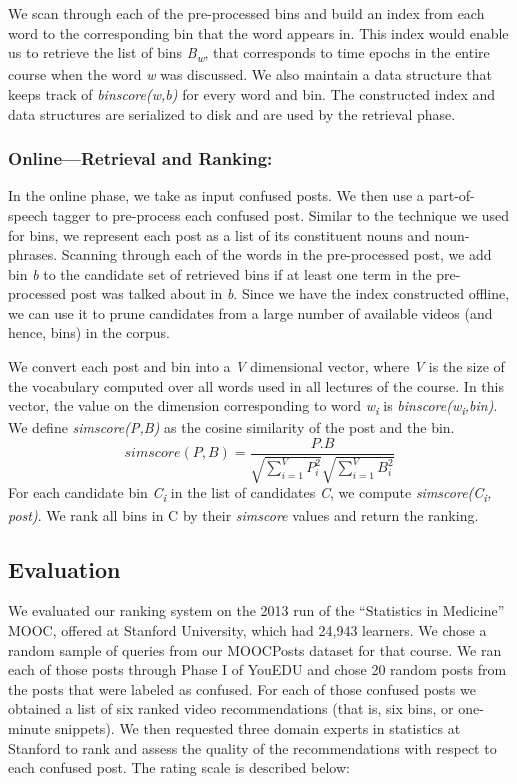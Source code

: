 \documentclass{edm_template}
\begin{document}
We scan through each of the pre-processed bins and build an index from each word to the corresponding bin that the word appears in. This index would enable us to retrieve the list of bins \textit{B\textsubscript{w}}, that corresponds to time epochs in the entire course when the word \textit{w} was discussed. We also maintain a data structure that keeps track of \textit{bin\textunderscore score(w,b)} for every word and bin. The constructed index and data structures are serialized to disk and are used by the retrieval phase.

\subsubsection{Online---Retrieval and Ranking:}
In the online phase, we take as input confused posts. We then use a part-of-speech tagger \cite{nltk} to pre-process each confused post. Similar to the technique we used for bins, we represent each post as a list of its constituent nouns and noun-phrases. Scanning through each of the words in the pre-processed post, we add bin \textit{b} to the candidate set of retrieved bins if at least one term in the pre-processed post was talked about in \textit{b}. Since we have the index constructed offline, we can use it to prune candidates from a large number of available videos (and hence, bins) in the corpus.

We convert each post and bin into a \textit{V} dimensional vector, where \textit{V} is the size of the vocabulary computed over all words used in all lectures of the course. In this vector, the value on the dimension corresponding to word  \textit{w\textsubscript i} is \textit{binscore(w\textsubscript i,bin)}. We define \textit{simscore(P,B)} as the cosine similarity of the post and the bin.
\begin{equation}
simscore(P,B) = \frac{P.B}{\sqrt{\sum\limits_{i=1}^V P_i ^2} \sqrt{\sum\limits_{i=1}^V B_i ^2}  }
\end{equation}
For each candidate bin \textit{C\textsubscript i} in the list of candidates \textit{C}, we compute \textit{simscore(C\textsubscript i, post)}. We rank all bins in C by their \textit{simscore} values and return the ranking.

\subsection{Evaluation}

We evaluated our ranking system on the 2013 run of the ``Statistics in Medicine'' MOOC, offered at Stanford University, which had 24,943 learners. We chose a random sample of queries from our MOOCPosts dataset for that course. We ran each of those posts through Phase I of YouEDU and chose 20 random posts from the posts that were labeled as confused. For each of those confused posts we obtained a list of six ranked video recommendations (that is, six bins, or one-minute snippets). We then requested  three domain experts in statistics at Stanford to rank and assess the quality of the recommendations with respect to each confused post. The rating scale is described below:
\end{document}
